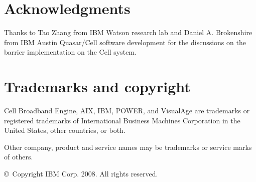 \section{Acknowledgments}

Thanks to Tao Zhang from IBM Watson research lab and Daniel A. Brokenshire from
IBM Austin Quasar/Cell software development for the discussions on the barrier
implementation on the Cell system.


\section{Trademarks and copyright}

Cell Broadband Engine, AIX, IBM, POWER, and VisualAge are trademarks or
registered trademarks of International Business Machines Corporation in the
United States, other countries, or both.

\noindent Other company, product and service names may be trademarks or service
marks of others.
  

\noindent \copyright\ Copyright IBM Corp. 2008.  All rights reserved.


